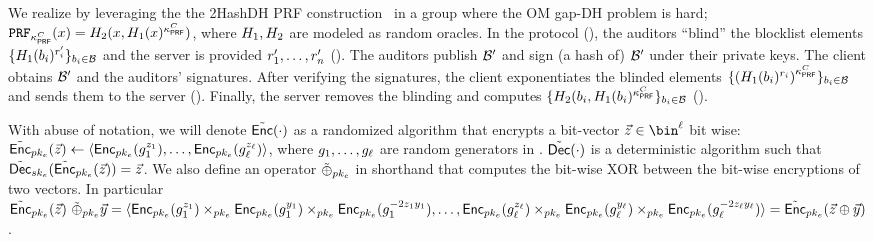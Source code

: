 We realize \authOPRFFunc by leveraging the the 2HashDH PRF construction~\cite{jarecki2014round} in a group where the OM gap-DH problem is hard; $\prf{\prfKeyClient}(\genericFnInput) = \oprfRO[2](\genericFnInput, \oprfRO[1](\genericFnInput)^{\prfKeyClient})$, where $\oprfRO[1], \oprfRO[2]$ are modeled as random oracles. 
In the protocol \protocolAuthOPRF (), the auditors ``blind'' the blocklist elements $\{ \oprfRO[1](\genericBlocklistElmt[\setIdx])^{\genericRand[\setIdx]'}\}_{\genericBlocklistElmt[\setIdx] \in \blocklist}$ and the server is provided $\genericRand[1]', \dots, \genericRand[\blocklistSize]'$ (). The auditors publish $\blocklist'$ and sign (a hash of) $\blocklist'$ under their private keys. The client obtains $\blocklist'$ and the auditors' signatures. After verifying the signatures, the client exponentiates the blinded elements $\{ \left(\oprfRO[1](\genericBlocklistElmt[\setIdx])^{\genericRand[\setIdx]}\right)^{\prfKeyClient}\}_{\genericBlocklistElmt[\setIdx] \in \blocklist}$ and sends them to the server (). Finally, the server removes the blinding and computes $\{ \oprfRO[2](\genericBlocklistElmt[\setIdx], \oprfRO[1](\genericBlocklistElmt[\setIdx])^{\prfKeyClient}\}_{\genericBlocklistElmt[\setIdx] \in \blocklist}$ (). 
\fi 

\iffalse
With abuse of notation, we will denote $\pkencryptVec(\cdot)$ as a randomized algorithm that encrypts a 
bit-vector $\genericVec \in \bin^{\genericVecLen}$ bit wise: $\pkencryptVec[\encryptPubKey](\genericVec) \assign \langle 
\pkencrypt[\encryptPubKey](\grpGen[1]^{\genericVec[1]}), \dots, \pkencrypt[\encryptPubKey](\grpGen[\genericVecLen]^{\genericVec[\genericVecLen]})\rangle$, 
where $\grpGen[1], \dots, \grpGen[\genericVecLen]$ are random generators in \group. $\pkdecryptVec(\cdot)$ 
is a deterministic algorithm such that $\pkdecryptVec[\encryptPrivKey](\pkencryptVec[\encryptPubKey](\genericVec)) = \genericVec$. We also 
define an operator $\homomorphicXORVec{\encryptPubKey}$ in shorthand that computes the bit-wise XOR between the bit-wise encryptions of two 
vectors. In particular $\pkencryptVec[\encryptPubKey](\genericVec) ~\homomorphicXORVec{\encryptPubKey} \clientVec = \langle \pkencrypt[\encryptPubKey](\grpGen[1]^{\genericVec[1]}) \homomorphicMul{\encryptPubKey} \pkencrypt[\encryptPubKey](\grpGen[1]^{\clientVec[1]}) \homomorphicMul{\encryptPubKey} 
\pkencrypt[\encryptPubKey](\grpGen[1]^{-2\genericVec[1] \clientVec[1]}), \dots, \pkencrypt[\encryptPubKey](\grpGen[\genericVecLen]^{\genericVec[\genericVecLen]}) \homomorphicMul{\encryptPubKey} \pkencrypt[\encryptPubKey](\grpGen[\genericVecLen]^{\clientVec[\genericVecLen]}) \homomorphicMul{\encryptPubKey} 
\pkencrypt[\encryptPubKey](\grpGen[\genericVecLen]^{-2\genericVec[\genericVecLen] \clientVec[\genericVecLen]}) \rangle = \pkencryptVec[\encryptPubKey](\genericVec \oplus \clientVec)$ . 

